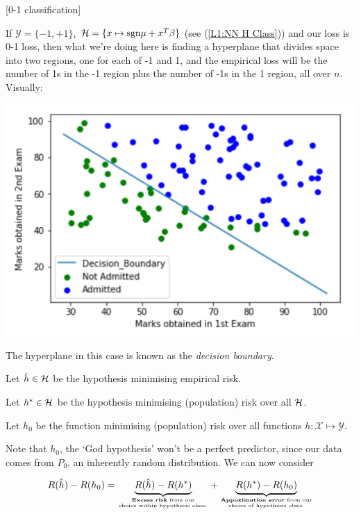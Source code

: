 \documentclass[11pt]{scrartcl}
\begin{document}
\begin{example}
[0-1 classification]

If $\mathcal{Y}= \{ -1, +1 \}$, $\mathcal{H} = \{ x \mapsto \text{sgn}{\mu + x^T \beta} \}$ (see (\ref{L1:NN H Class})) and our loss is 0-1 loss, then what we're doing here is finding a hyperplane that divides space into two regions, one for each of -1 and 1, and the empirical loss will be the number of 1s in the -1 region plus the number of -1s in the 1 region, all over $n$. Visually:

\begin{center}              \includegraphics[scale=0.5]{decisionboundary.png}
    \label{fig:L2 Decision Boundary}
\end{center}

The hyperplane in this case is known as the \emph{decision boundary}.
\end{example}

\begin{definition}

Let $\hat{h} \in \mathcal{H}$ be the hypothesis minimising empirical risk.

Let $h^* \in \mathcal{H}$ be the hypothesis minimising (population) risk over all $\mathcal{H}$.

Let $h_0$ be the function minimising (population) risk over all functions $h : \mathcal{X} \mapsto \mathcal{Y}$.
\end{definition}

Note that $h_0$, the `God hypothesis' won't be a perfect predictor, since our data comes from $P_0$, an inherently random distribution. 
We can now consider

\begin{equation}
    R(\hat{h}) - R(h_0) = \underbrace{R(\hat{h}) - R(h^*)}_{\text{\textbf{Excess risk} from our}\atop \text{choice within hypothesis class.}} + \underbrace{R(h^*) - R(h_0)} _{\text{\textbf{Appoximation error} from our} \atop \text{choice of hypothesis class.}}
\label{L2:excess risk and approx error}
\end{equation}
\end{document}
